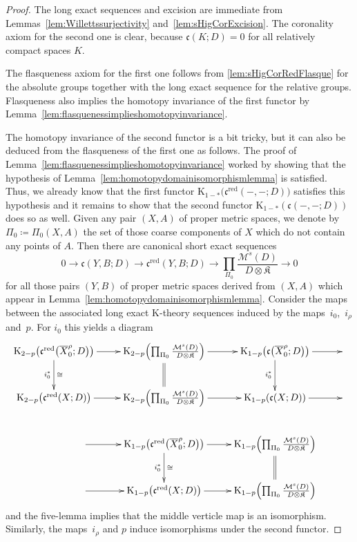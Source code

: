 \documentclass[pdftex]{sigma}
\numberwithin{equation}{section}
\theoremstyle{definition}
\newcommand{\K}{\mathrm{K}}
\newcommand{\sHigCor}{\mathfrak{c}}
\newcommand{\sHigCorRed}{\mathfrak{c}^{\mathrm{red}}}
\newcommand{\Kom}{{\mathfrak{K}}}
\newcommand{\multiplier}{{\mathcal{M}}}
\newcommand{\coarsecomp}{\Pi_0}
\begin{document}
\begin{proof}
The long exact sequences and excision are immediate from Lemmas~\ref{lem:Willettssurjectivity} and~\ref{lem:sHigCorExcision}. The coronality axiom for the second one is clear, because $\sHigCor(K;D)=0$ for all relatively compact spaces $K$.

The flasqueness axiom for the first one follows from \ref{lem:sHigCorRedFlasque} for the absolute groups together with the long exact sequence for the relative groups.
Flasqueness also implies the homotopy invariance of the first functor by Lemma~\ref{lem:flasquenessimplieshomotopyinvariance}.

The homotopy invariance of the second functor is a bit tricky, but it can also be deduced from the flasqueness of the first one as follows.
The proof of Lemma~\ref{lem:flasquenessimplieshomotopyinvariance} worked by showing that the hypothesis of Lemma~\ref{lem:homotopydomainisomorphismlemma} is satisfied.
Thus, we already know that the first functor $\K_{1-*}\big(\sHigCorRed(-,-;D)\big)$ satisfies this hypothesis and it remains to show that the second functor $\K_{1-*}(\sHigCor(-,-;D))$ does so as well.
Given any pair $(X,A)$ of proper metric spaces, we denote by $\coarsecomp\coloneqq\coarsecomp(X,A)$ the set of those coarse components of $X$ which do not contain any points of $A$.
Then there are canonical short exact sequences
\[
0\to \sHigCor(Y,B;D)\to \sHigCorRed(Y,B;D)\to \prod_{\coarsecomp}\frac{\multiplier^s(D)}{D\otimes\Kom}\to 0
\]
for all those pairs $(Y,B)$ of proper metric spaces derived from $(X,A)$ which appear in Lemma~\ref{lem:homotopydomainisomorphismlemma}.
Consider the maps between the associated long exact $\K$-theory sequences induced by the maps~$i_0$,~$i_\rho$ and~$p$.
For $i_0$ this yields a diagram
\[
\xymatrix{
\K_{2-p}\big(\sHigCorRed\big(\overline{X}_0^\rho;D\big)\big)\ar[r]\ar[d]_{i_0^*}^{\cong}
&\K_{2-p}\Bigl(\prod_{\coarsecomp}\frac{\multiplier^s(D)}{D\otimes\Kom}\Bigr)\ar[r]\ar@{=}[d]
&\K_{1-p}\big(\sHigCor\big(\overline{X}_0^\rho;D\big)\big)\ar[r]\ar[d]_{i_0^*}
&
\\\K_{2-p}\big(\sHigCorRed(X;D)\big)\ar[r]
&\K_{2-p}\Bigl(\prod_{\coarsecomp}\frac{\multiplier^s(D)}{D\otimes\Kom}\Bigr)\ar[r]
&\K_{1-p}(\sHigCor(X;D))\ar[r]
&
\\\qquad\qquad\qquad\ar[r]&\K_{1-p}\big(\sHigCorRed\big(\overline{X}_0^\rho;D\big)\big)\ar[r]\ar[d]_{i_0^*}^{\cong}
&\K_{1-p}\Bigl(\prod_{\coarsecomp}\frac{\multiplier^s(D)}{D\otimes\Kom}\Bigr)\ar@{=}[d]
&
\\\qquad\qquad\qquad\ar[r]&\K_{1-p}\big(\sHigCorRed(X;D)\big)\ar[r]
&\K_{1-p}\Bigl(\prod_{\coarsecomp}\frac{\multiplier^s(D)}{D\otimes\Kom}\Bigr)
&
}
\]
and the five-lemma implies that the middle verticle map is an isomorphism. Similarly, the maps~$i_\rho$ and $p$ induce isomorphisms under the second functor.
\end{proof}
\end{document}
